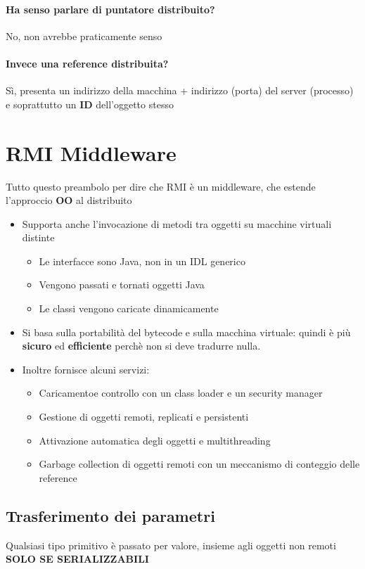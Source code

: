 \documentclass[12pt, a4paper, openany, twoside]{book}
\begin{document}
\paragraph{Ha senso parlare di puntatore distribuito?} No, non avrebbe praticamente
senso
\paragraph{Invece una reference distribuita?} Sì, presenta un indirizzo della
macchina + indirizzo (porta) del server (processo) e soprattutto un \textbf{ID}
dell'oggetto stesso
\section{RMI Middleware}
Tutto questo preambolo per dire che RMI è un middleware, che estende l'approccio
\textbf{OO} al distribuito
\begin{itemize}
	\item Supporta anche l'invocazione di metodi tra oggetti su macchine 
	virtuali distinte
	\begin{itemize}
		\item Le interfacce sono Java, non in un IDL generico
		\item Vengono passati e tornati oggetti Java
		\item Le classi vengono caricate dinamicamente
	\end{itemize}
	\item Si basa sulla portabilità del bytecode e sulla macchina virtuale:
	quindi è più \textbf{sicuro} ed \textbf{efficiente} perchè non si deve
	tradurre nulla.
	\item Inoltre fornisce alcuni servizi:
	\begin{itemize}
		\item Caricamentoe controllo con un class loader e un security manager
		\item Gestione di oggetti remoti, replicati e persistenti
		\item Attivazione automatica degli oggetti e multithreading
		\item Garbage collection di oggetti remoti con un meccanismo di conteggio
		delle reference
	\end{itemize}
\end{itemize}
\subsection{Trasferimento dei parametri}
Qualsiasi tipo primitivo è passato per valore, insieme agli oggetti non remoti
\color{red}\textbf{SOLO SE SERIALIZZABILI}\color{black}
\end{document}
